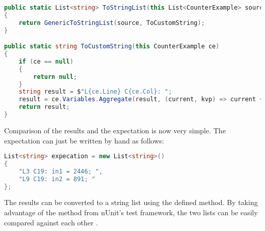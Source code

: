 \begin{lstlisting}[language=csharp, caption={Converting CounterExamples to strings}, captionpos=b, label={lst:converterCEToString}]
public static List<string> ToStringList(this List<CounterExample> source)
{
    return GenericToStringList(source, ToCustomString);
}

public static string ToCustomString(this CounterExample ce)
{
    if (ce == null)
    {
        return null;
    }
    string result = $"L{ce.Line} C{ce.Col}: ";
    result = ce.Variables.Aggregate(result, (current, kvp) => current + $"{kvp.Key} = {kvp.Value}; ");
    return result;
}
\end{lstlisting}

Comparison of the results and the expectation is now very simple. The expectation can just be written by hand as follows:

\begin{lstlisting}[language=csharp, caption={Expectation}, captionpos=b, label={lst:testexpectation}]
List<string> expecation = new List<string>()
{
    "L3 C19: in1 = 2446; ",
    "L9 C19: in2 = 891; "
};
\end{lstlisting}

The results can be converted to a string list using the defined  method. By taking advantage of the method  from nUnit's test framework, the two lists can be easily compared against each other \cite{nunitCollectionAssert}.

